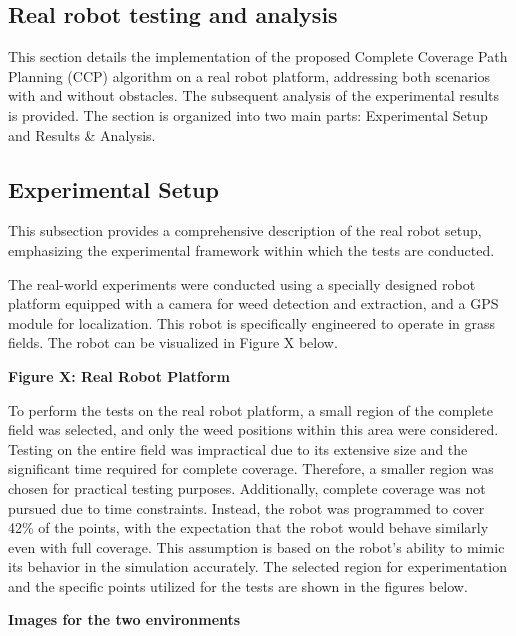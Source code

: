 
\subsection{Real robot testing and analysis} 

This section details the implementation of the proposed Complete Coverage Path Planning (CCP) algorithm on a real robot platform, addressing both scenarios with and without obstacles. The subsequent analysis of the experimental results is provided. The section is organized into two main parts: Experimental Setup and Results \& Analysis. 

\subsection{Experimental Setup} 

This subsection provides a comprehensive description of the real robot setup, emphasizing the experimental framework within which the tests are conducted.   

\vspace*{6mm}   


The real-world experiments were conducted using a specially designed robot platform equipped with a camera for weed detection and extraction, and a GPS module for localization. This robot is specifically engineered to operate in grass fields. The robot can be visualized in Figure X below.  

\textbf{Figure X: Real Robot Platform} 

\vspace*{6mm}   


To perform the tests on the real robot platform, a small region of the complete field was selected, and only the weed positions within this area were considered. Testing on the entire field was impractical due to its extensive size and the significant time required for complete coverage. Therefore, a smaller region was chosen for practical testing purposes. Additionally, complete coverage was not pursued due to time constraints. Instead, the robot was programmed to cover 42\% of the points, with the expectation that the robot would behave similarly even with full coverage. This assumption is based on the robot's ability to mimic its behavior in the simulation accurately. The selected region for experimentation and the specific points utilized for the tests are shown in the figures below. 

\textbf{Images for the two environments}  
\vspace*{6mm}   


